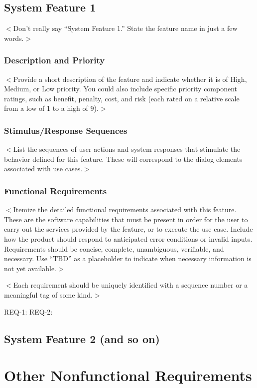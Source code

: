 \documentclass{scrreprt}
\begin{document}
\section{System Feature 1}
$<$Don’t really say “System Feature 1.” State the feature name in just a few
words.$>$

\subsection{Description and Priority}
$<$Provide a short description of the feature and indicate whether it is of
High, Medium, or Low priority. You could also include specific priority
component ratings, such as benefit, penalty, cost, and risk (each rated on a
relative scale from a low of 1 to a high of 9).$>$

\subsection{Stimulus/Response Sequences}
$<$List the sequences of user actions and system responses that stimulate the
behavior defined for this feature. These will correspond to the dialog elements
associated with use cases.$>$

\subsection{Functional Requirements}
$<$Itemize the detailed functional requirements associated with this feature.
These are the software capabilities that must be present in order for the user
to carry out the services provided by the feature, or to execute the use case.
Include how the product should respond to anticipated error conditions or
invalid inputs. Requirements should be concise, complete, unambiguous,
verifiable, and necessary. Use “TBD” as a placeholder to indicate when necessary
information is not yet available.$>$

$<$Each requirement should be uniquely identified with a sequence number or a
meaningful tag of some kind.$>$

REQ-1:	REQ-2:

\section{System Feature 2 (and so on)}


\chapter{Other Nonfunctional Requirements}
\end{document}
